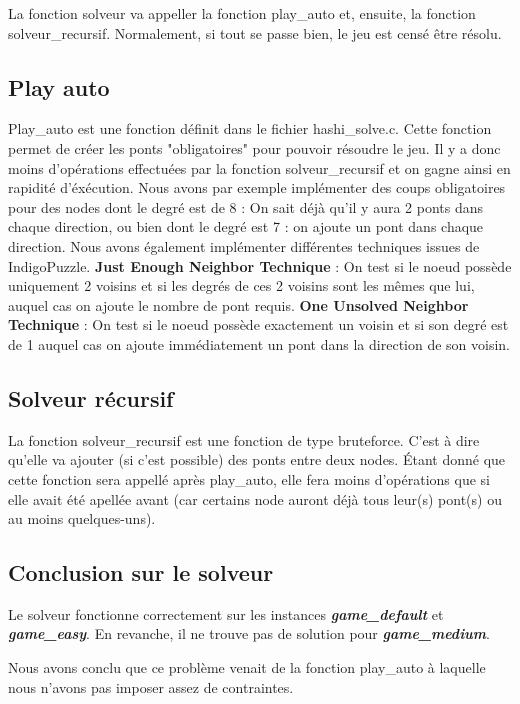 \documentclass[12]{report}
\begin{document}
		La fonction solveur va appeller la fonction play\_auto et, ensuite, la fonction solveur\_recursif.
		Normalement, si tout se passe bien, le jeu est censé être résolu.

		\subsection{Play auto}
		Play\_auto est une fonction définit dans le fichier hashi\_solve.c. Cette fonction permet de créer les ponts "obligatoires"
		pour pouvoir résoudre le jeu. Il y a donc moins d'opérations effectuées par la fonction solveur\_recursif et on gagne ainsi en rapidité d'éxécution.
		Nous avons par exemple implémenter des coups obligatoires pour des nodes dont le degré est de 8 : On sait déjà qu'il y aura 2 ponts dans chaque direction, ou bien dont le degré est 7 : on ajoute un pont dans chaque direction.
		Nous avons également implémenter différentes techniques issues de IndigoPuzzle.
		\newline \textbf{Just Enough Neighbor Technique} : On test si le noeud possède uniquement 2 voisins
        et si les degrés de ces 2 voisins sont les mêmes que lui, auquel cas on ajoute le nombre de pont requis.
        \newline \textbf{One Unsolved Neighbor Technique}  : On test si le noeud possède exactement un voisin et si son degré est de 1 auquel cas on ajoute immédiatement un pont dans la direction de son voisin.
		\subsection{Solveur récursif}
		La fonction solveur\_recursif est une fonction de type bruteforce. C'est à dire qu'elle va ajouter (si c'est possible)
		des ponts entre deux nodes.
		\newline Étant donné que cette fonction sera appellé après play\_auto, elle fera moins d'opérations que si elle avait été
		apellée avant (car certains node auront déjà tous leur(s) pont(s) ou au moins quelques-uns).
		\subsection{Conclusion sur le solveur}
		Le solveur fonctionne correctement sur les instances \textbf{\emph{game\_default}} et \textbf{\emph{game\_easy}}.
		En revanche, il ne trouve pas de solution pour \textbf{\emph{game\_medium}}.

		Nous avons conclu que ce problème venait de la fonction play\_auto à laquelle nous n'avons pas imposer assez de contraintes.
\end{document}
